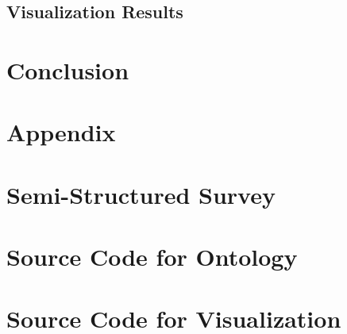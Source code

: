 \documentclass[runningheads]{llncs}
\begin{document}
\subsection{Visualization Results}

\section{Conclusion}

\section{Appendix}
\appendix
\section{Semi-Structured Survey}
%

\section{Source Code for Ontology}
\section{Source Code for Visualization}



\end{document}
